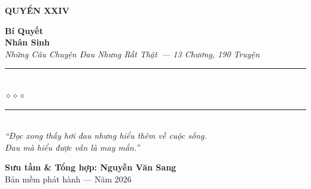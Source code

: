 \begin{titlepage}
\begin{center}
  \begin{tcolorbox}[
    width=6.5cm,
    colback=earthgold!20,
    colframe=earthgold!80!black,
    arc=4pt,
    boxrule=1.5pt,
    halign=center
  ]
    {\fontsize{18}{22}\selectfont\bfseries\color{inkdark!80!black}
     QUYỂN XXIV}
  \end{tcolorbox}
  \vspace{0.8cm}

  {\fontsize{38}{45}\selectfont\bfseries\color{inkdark!80!black}
    Bí Quyết}\\[0.4cm]
  {\fontsize{38}{45}\selectfont\bfseries\color{earthgold!80!black}
    Nhân Sinh}\\[0.4cm]

  {\fontsize{16}{20}\selectfont\color{earthgold!90!black}\itshape
    Những Câu Chuyện Đau Nhưng Rất Thật~--- 13 Chương, 190 Truyện}\\[1cm]

  {\color{sepia!60}\rule{6cm}{1pt}}\\[5pt]
  {\color{earthgold!80!black}\large$\diamond$\hspace{1cm}$\diamond$\hspace{1cm}$\diamond$}\\[5pt]
  {\color{sepia!60}\rule{6cm}{1pt}}\\[1.5cm]

  {\normalsize\itshape\color{sepia!90!black}
   ``Đọc xong thấy hơi đau nhưng hiểu thêm về cuộc sống.\\
   Đau mà hiểu được vẫn là may mắn.''}

  \vfill

  {\fontsize{16}{20}\selectfont\bfseries\color{sepia!90!black}
    Sưu tầm \& Tổng hợp: \textbf{Nguyễn Văn Sang}}\\[0.4cm]

  {\small\color{gray} Bản mềm phát hành --- Năm 2026}\\[0.5cm]
\end{center}

\afterpage{\nopagecolor}
\end{titlepage}